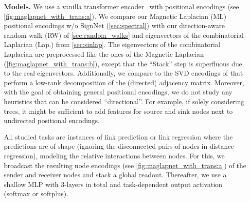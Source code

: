 \documentclass{article}
\begin{document}
\textbf{Models.} We use a vanilla transformer encoder~\citep{vaswani_attention_2017} with positional encodings (see \autoref{fig:maglapnet_with_trans:a}). We compare our Magnetic Laplacian (ML) positional encodings w/o SignNet (\autoref{sec:spectral}) with our direction-aware random walk (RW) of \autoref{sec:random_walks} and eigenvectors of the combinatorial Laplacian (Lap.) from \autoref{sec:sinlap}. The eigenvectors of the combinatorial Laplacian are preprocessed like the ones of the Magnetic Laplacian (\autoref{fig:maglapnet_with_trans:b}), except that the ``Stack'' step is superfluous due to the real eigenvectors. Additionally, we compare to the SVD encodings of \citet{hussain_global_2022} that perform a low-rank decomposition of the (directed) adjacency matrix. Moreover, with the goal of obtaining general positional encodings, we do not study any heuristics that can be considered ``directional''. For example, if solely considering trees, it might be sufficient to add features for source and sink nodes next to undirected positional encodings.

All studied tasks are instances of link prediction or link regression where the predictions are of shape  (ignoring the disconnected pairs of nodes in distance regression), modeling the relative interactions between nodes. For this, we broadcast the resulting node encodings  (see \autoref{fig:maglapnet_with_trans:a}) of the sender and receiver nodes and stack a global readout. Thereafter, we use a shallow MLP with 3-layers in total and task-dependent output activation (softmax or softplus).
\end{document}
